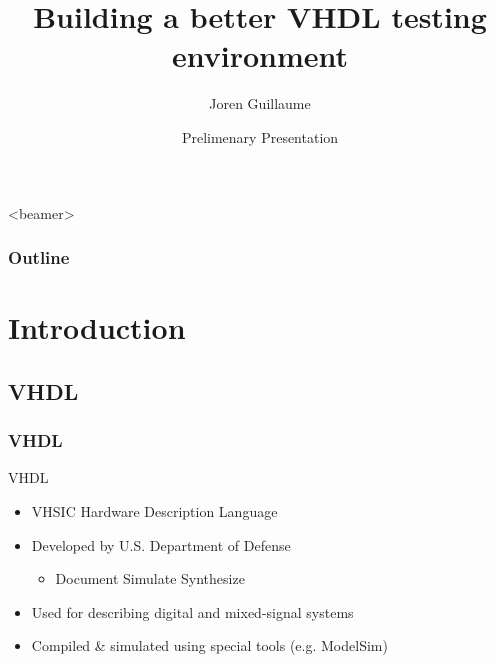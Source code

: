 \documentclass[british,10pt]{beamer}
\title{Building a better VHDL testing environment}
\author[J. Guillaume]{Joren Guillaume}
\date[DEC'14, Gent]{Prelimenary Presentation}
\institute[Ghent University]
{
  FEA\\
  Ghent University
}
\begin{document}
\begin{frame}[plain]
  \titlepage
\end{frame}



\begin{frame}<beamer>\frametitle{Outline}
  \tableofcontents
\end{frame}

\section{Introduction}
\subsection{VHDL}

\begin{frame}\frametitle{VHDL}
VHDL
\begin{itemize}
\item VHSIC Hardware Description Language
\item Developed by U.S. Department of Defense
\begin{itemize}
\item Document  Simulate  Synthesize
\end{itemize}
\item Used for describing digital and mixed-signal systems 
\item Compiled \& simulated using special tools (e.g. ModelSim)
\end{itemize}
\end{frame}
\end{document}
